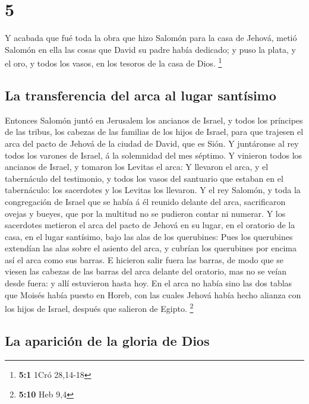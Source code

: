 \hypertarget{section-4}{%
\section{5}\label{section-4}}

 Y acabada que fué toda la obra que hizo Salomón para la
casa de Jehová, metió Salomón en ella las cosas que David su padre había
dedicado; y puso la plata, y el oro, y todos los vasos, en los tesoros
de la casa de Dios. \footnote{\textbf{5:1} 1Cró 28,14-18}

\hypertarget{la-transferencia-del-arca-al-lugar-santuxedsimo}{%
\subsection{La transferencia del arca al lugar
santísimo}\label{la-transferencia-del-arca-al-lugar-santuxedsimo}}

 Entonces Salomón juntó en Jerusalem los ancianos de
Israel, y todos los príncipes de las tribus, los cabezas de las familias
de los hijos de Israel, para que trajesen el arca del pacto de Jehová de
la ciudad de David, que es Sión.  Y juntáronse al rey
todos los varones de Israel, á la solemnidad del mes séptimo.
 Y vinieron todos los ancianos de Israel, y tomaron los
Levitas el arca:  Y llevaron el arca, y el tabernáculo del
testimonio, y todos los vasos del santuario que estaban en el
tabernáculo: los sacerdotes y los Levitas los llevaron.  Y
el rey Salomón, y toda la congregación de Israel que se había á él
reunido delante del arca, sacrificaron ovejas y bueyes, que por la
multitud no se pudieron contar ni numerar.  Y los
sacerdotes metieron el arca del pacto de Jehová en su lugar, en el
oratorio de la casa, en el lugar santísimo, bajo las alas de los
querubines:  Pues los querubines extendían las alas sobre
el asiento del arca, y cubrían los querubines por encima así el arca
como sus barras.  E hicieron salir fuera las barras, de
modo que se viesen las cabezas de las barras del arca delante del
oratorio, mas no se veían desde fuera: y allí estuvieron hasta hoy.
 En el arca no había sino las dos tablas que Moisés había
puesto en Horeb, con las cuales Jehová había hecho alianza con los hijos
de Israel, después que salieron de Egipto. \footnote{\textbf{5:10} Heb
  9,4}

\hypertarget{la-apariciuxf3n-de-la-gloria-de-dios}{%
\subsection{La aparición de la gloria de
Dios}\label{la-apariciuxf3n-de-la-gloria-de-dios}}

